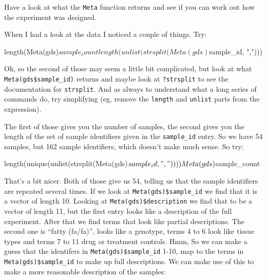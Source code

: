 \documentclass[11pt]{article}
\begin{document}
Have a look at what the \texttt{Meta} function returns and see if you can
work out how the experiment was designed.

When I had a look at the data I noticed a couple of things. Try:

\begin{rcode}
  length(Meta(gds)$sample_count
  length(unlist( strsplit( Meta(gds)$sample_id, ",")))
\end{rcode}

Ok, so the second of those may seem a little bit complicated, but look at
what \texttt{Meta(gds\$sample\_id)} returns and maybe look at 
\texttt{?strsplit} to see the documentation for \texttt{strsplit}. And
as always to understand what a long series of commands do, try simplifying
(eg, remove the \texttt{length} and \texttt{unlist} parts from the
expression).

The first of those gives you the number of samples, the second gives you
the length of the set of sample identifiers given in the \texttt{sample\_id}
entry. So we have 54 samples, but 162 sample identifiers, which doesn't
make much sense. So try:

\begin{rcode}
length(unique(unlist(strsplit(Meta(gds)$sample_id, ","))))
Meta(gds)$sample_count
\end{rcode}

That's a bit nicer. Both of those give us 54, telling us that the sample
identifiers are repeated several times. If we look at \texttt{Meta(gds)\$sample\_id}
we find that it is a vector of length 10. Looking at \texttt{Meta(gds)\$description}
we find that to be a vector of length 11, but the first entry looks like
a description of the full experiment. After that we find terms that look
like partial descriptions. The second one is ``fatty (fa/fa)'', looks like a
genotype, terms 4 to 6 look like tissue types and terms 7 to 11 drug or
treatment controls. Hmm, So we can make a guess that the identifers in
\texttt{Meta(gds)\$sample\_id} 1-10, map to the terms in \texttt{Meta(gds)\$sample\_id}
to make up full descriptions. We can make use of this to make a more
reasonable description of the samples:
\end{document}
